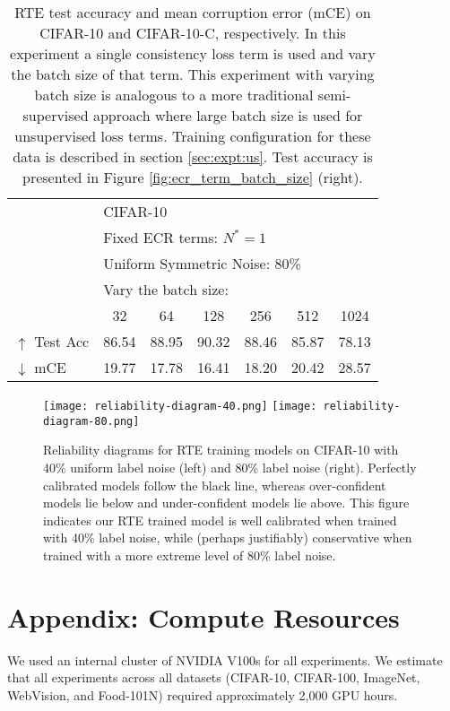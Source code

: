 \documentclass{article}
\begin{document}
\begin{table*}
    \renewcommand{\arraystretch}{1.3}
    \centering
    \caption{RTE test accuracy and mean corruption error (mCE) on CIFAR-10 and CIFAR-10-C, respectively.  In this experiment a single consistency loss term is used and vary the batch size of that term. This experiment with varying batch size is analogous to a more traditional semi-supervised approach where large batch size is used for unsupervised loss terms.  Training configuration for these data is described in section \ref{sec:expt:us}.  Test accuracy is presented in Figure \ref{fig:ecr_term_batch_size} (right).}\begin{tabular}{lcccccc}
        \\
        \toprule
        &\multicolumn{6}{l}{CIFAR-10} \\
        &\multicolumn{6}{l}{Fixed ECR terms: $N^*=1$} \\
        &\multicolumn{6}{l}{Uniform Symmetric Noise: 80\%} \\
        \hline
        &\multicolumn{6}{l}{Vary the batch size:} \\
         & 32 & 64 & 128 & 256 & 512 & 1024  \\
         \hline
         $\uparrow$ Test Acc & 86.54 & 88.95 & 90.32 & 88.46 & 85.87 & 78.13 \\
         $\downarrow$ mCE & 19.77 & 17.78 & 16.41 & 18.20 & 20.42 & 28.57 \\
         \bottomrule
    \end{tabular}
    \label{tab:fig1_right}
\end{table*}

\begin{figure*}
  \centering
  \texttt{[image: reliability-diagram-40.png]}
  \texttt{[image: reliability-diagram-80.png]}
  \caption{Reliability diagrams for RTE training models on CIFAR-10 with 40\% uniform label noise (left) and 80\% label noise (right). Perfectly calibrated models follow the black line, whereas over-confident models lie below and under-confident models lie above. This figure indicates our RTE trained model is well calibrated when trained with 40\% label noise, while (perhaps justifiably) conservative when trained with a more extreme level of 80\% label noise.}
  \label{fig:reliability-diagrams}
\end{figure*}



\section{Appendix: Compute Resources}

We used an internal cluster of NVIDIA V100s for all experiments. We estimate that all experiments across all datasets (CIFAR-10, CIFAR-100, ImageNet, WebVision, and Food-101N) required approximately 2,000 GPU hours.
\end{document}
